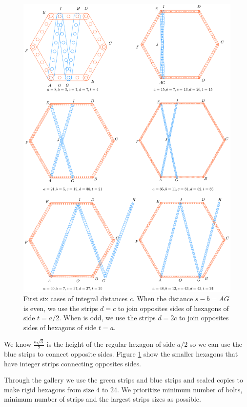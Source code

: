 \documentclass[11pt]{article}
\begin{document}
\begin{figure}[h]
\centering
\includegraphics[scale=0.8]{build/hexa-builder-b}
\caption{First six cases of integral distances $c$. When the distance $s-b = \overline{AG}$ is even, we use the strips $d = c$ to join opposites sides of hexagons of side $t = a/2$. When is odd, we use the strips $d = 2c$ to join opposites sides of hexagons of side $t = a$.}
\label{fig:builder-b}
\end{figure}

We know $\frac{a\sqrt3}2$ is the height of the regular hexagon of side $a/2$ so we can use the blue strips to connect opposite sides. Figure \ref{fig:builder-b} show the smaller hexagons that have integer strips connecting opposites sides.

Through the gallery we use the green strips and blue strips and scaled copies to make rigid hexagons from size $4$ to $24$. We prioritize minimum number of bolts, minimum number of strips and the largest strips sizes as possible.
\end{document}
